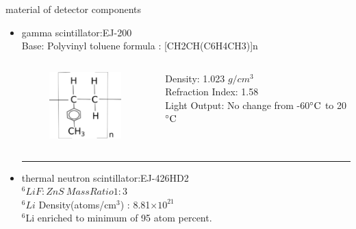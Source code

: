 \documentclass[11pt,compress,xcolor=x11names,UTF8]{beamer}
\begin{document}
\begin{frame}{ material of detector components}
\begin{itemize}
	\item gamma scintillator:EJ-200   \\
		Base: Polyvinyl toluene \quad  formula : [CH2CH(C6H4CH3)]n
\begin{columns}
\begin{column}{.23\textwidth}
\begin{figure}
	\includegraphics[width=0.97\textwidth]{currentfig/Chemical_formula_for_polyvinyl_tolulene.png}
\end{figure}
\end{column}
\begin{column}{.73\textwidth}
	Density: 1.023 $g/cm^3$\\
	Refraction Index: 1.58 \\
	Light Output: No change from -60$\celsius $ to 20 $\celsius$
\end{column}
\end{columns}
	\vspace{.5cm}
	\hrule{\textwidth}
	\vspace{.5cm}

	\item thermal neutron scintillator:EJ-426HD2\\
	$^6LiF:ZnS \ Mass Ratio 1:3$\\
		$^6Li $ Density(atoms/cm$^3$)  : 8.81$\times 10^{21}$\\
		$^6$Li enriched to minimum of 95 atom percent.
\end{itemize}
\end{frame}
\end{document}
